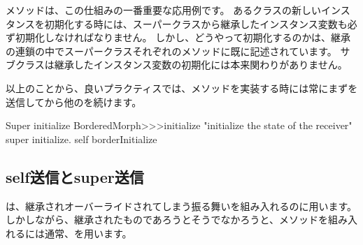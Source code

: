 \documentclass[a4paper,10pt,twoside]{book}
\begin{document}
メソッドは、この仕組みの一番重要な応用例です。
あるクラスの新しいインスタンスを初期化する時には、スーパークラスから継承したインスタンス変数も必ず初期化しなければなりません。
しかし、どうやって初期化するのかは、継承の連鎖の中でスーパークラスそれぞれのメソッドに既に記述されています。
サブクラスは継承したインスタンス変数の初期化には本来関わりがありません。

以上のことから、良いプラクティスでは、メソッドを実装する時には常にまずを送信してから他のを続けます。

\begin{method}[morphinit]{Super initialize}
BorderedMorph>>>initialize
	"initialize the state of the receiver"
	super initialize.
	self borderInitialize
\end{method}


\subsection{self送信とsuper送信}

\super{}は、継承されオーバーライドされてしまう振る舞いを組み入れるのに用います。
しかしながら、継承されたものであろうとそうでなかろうと、メソッドを組み入れるには通常、\self{}を用います。
\end{document}
